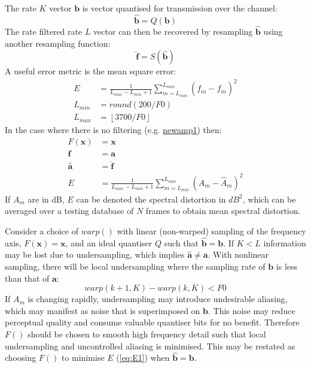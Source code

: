 \documentclass{article}
\begin{document}
The rate $K$ vector $\mathbf{b}$ is vector quantised for transmission over the channel:
\begin{equation}
\hat{\mathbf{b}} = Q(\mathbf{b})
\end{equation}
The rate filtered rate $L$ vector can then be recovered by resampling $\mathbf{\hat{b}}$ using another resampling function:
\begin{equation}
\hat{\mathbf{f}} = S(\hat{\mathbf{b}})
\end{equation}
A useful error metric is the mean square error:
\begin{equation} \label{eq:E1}
\begin{split}
E & =\frac{1}{L_{max}-L_{min}+1}\sum_{m=L_{min}}^{L_{max}}(f_m-\hat{f}_m)^2 \\
L_{min} & = round(200/F0) \\
L_{max} & =\left \lfloor 3700/F0  \right \rfloor
\end{split}
\end{equation}
In the case where there is no filtering (e.g. \url{newamp1}) then:
\begin{equation}
\begin{split}
F(\mathbf{x}) &= \mathbf{x} \\
\mathbf{f} &= \mathbf{a} \\
\hat{\mathbf{a}} &= \hat{\mathbf{f}} \\
E &=\frac{1}{L_{max}-L_{min}+1}\sum_{m=L_{min}}^{L_{max}}(A_m-\hat{A}_m)^2 
\end{split}
\end{equation}
If $A_m$ are in dB, $E$ can be denoted the spectral distortion in $dB^2$, which can be averaged over a testing database of $N$ frames to obtain mean spectral distortion.

Consider a choice of $warp()$ with linear (non-warped) sampling of the frequency axis, $F(\mathbf{x})=\mathbf{x}$, and an ideal quantiser $Q$ such that $\hat{\mathbf{b}} = \mathbf{b}$. If $K<L$ information may be lost due to undersampling, which implies $\hat{\mathbf{a}} \neq \mathbf{a}$.  
With nonlinear sampling, there will be local undersampling where the sampling rate of $\mathbf{b}$ is less than that of $\mathbf{a}$:
\begin{equation}
warp(k+1,K)-warp(k,K) < F0
\end{equation}
If $A_m$ is changing rapidly, undersampling may introduce undesirable aliasing, which may manifest as noise that is superimposed on $\mathbf{b}$. This noise may reduce perceptual quality and consume valuable quantiser bits for no benefit. Therefore $F()$ should be chosen to smooth high frequency detail such that local undersampling and uncontrolled aliasing is minimised. This may be restated as choosing $F()$ to minimise $E$ (\ref{eq:E1}) when $\hat{\mathbf{b}} = \mathbf{b}$.
\end{document}
